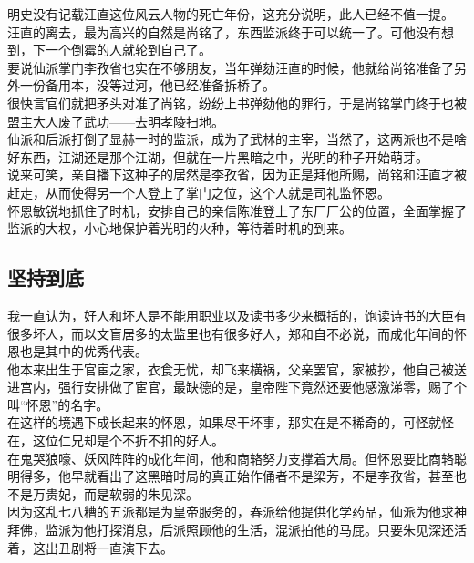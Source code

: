\begin{multicols}{\theparacolNo}
明史没有记载汪直这位风云人物的死亡年份，这充分说明，此人已经不值一提。\\

汪直的离去，最为高兴的自然是尚铭了，东西监派终于可以统一了。可他没有想到，下一个倒霉的人就轮到自己了。\\

要说仙派掌门李孜省也实在不够朋友，当年弹劾汪直的时候，他就给尚铭准备了另外一份备用本，没等过河，他已经准备拆桥了。\\

很快言官们就把矛头对准了尚铭，纷纷上书弹劾他的罪行，于是尚铭掌门终于也被盟主大人废了武功——去明孝陵扫地。\\

仙派和后派打倒了显赫一时的监派，成为了武林的主宰，当然了，这两派也不是啥好东西，江湖还是那个江湖，但就在一片黑暗之中，光明的种子开始萌芽。\\

说来可笑，亲自播下这种子的居然是李孜省，因为正是拜他所赐，尚铭和汪直才被赶走，从而使得另一个人登上了掌门之位，这个人就是司礼监怀恩。\\

怀恩敏锐地抓住了时机，安排自己的亲信陈准登上了东厂厂公的位置，全面掌握了监派的大权，小心地保护着光明的火种，等待着时机的到来。\\

\subsection{坚持到底}
我一直认为，好人和坏人是不能用职业以及读书多少来概括的，饱读诗书的大臣有很多坏人，而以文盲居多的太监里也有很多好人，郑和自不必说，而成化年间的怀恩也是其中的优秀代表。\\

他本来出生于官宦之家，衣食无忧，却飞来横祸，父亲罢官，家被抄，他自己被送进宫内，强行安排做了宦官，最缺德的是，皇帝陛下竟然还要他感激涕零，赐了个叫“怀恩”的名字。\\

在这样的境遇下成长起来的怀恩，如果尽干坏事，那实在是不稀奇的，可怪就怪在，这位仁兄却是个不折不扣的好人。\\

在鬼哭狼嚎、妖风阵阵的成化年间，他和商辂努力支撑着大局。但怀恩要比商辂聪明得多，他早就看出了这黑暗时局的真正始作俑者不是梁芳，不是李孜省，甚至也不是万贵妃，而是软弱的朱见深。\\

因为这乱七八糟的五派都是为皇帝服务的，春派给他提供化学药品，仙派为他求神拜佛，监派为他打探消息，后派照顾他的生活，混派拍他的马屁。只要朱见深还活着，这出丑剧将一直演下去。\\


\end{multicols}
